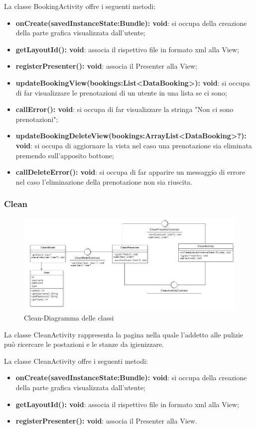 La classe BookingActivity offre i seguenti metodi:
\begin{itemize}
	\item \textbf{onCreate(savedInstanceState:Bundle): void}: si occupa della creazione della parte grafica visualizzata dall'utente; 
	\item \textbf{getLayoutId(): void}: associa il rispettivo file in formato xml alla View;
	\item \textbf{registerPresenter(): void}: associa il Presenter alla View;
	\item \textbf{updateBookingView(bookings:List<DataBooking>): void}: si occupa di far visualizzare le prenotazioni di un utente in una lista se ci sono;
	\item \textbf{callError(): void}: si occupa di far visualizzare la stringa "Non ci sono prenotazioni";
	\item \textbf{updateBookingDeleteView(bookings:ArrayList<DataBooking>?): void}: si occupa di aggiornare la vista nel caso una prenotazione sia eliminata premendo sull'apposito bottone;
	\item \textbf{callDeleteError(): void}: si occupa di far apparire un messaggio di errore nel caso l'eliminazione della prenotazione non sia riuscita.
\end{itemize}

\subsubsection{Clean}
\begin{figure}[H]
	\centering
	\includegraphics[width=16cm]{res/images/Clean.png}
	\caption{Clean-Diagramma delle classi}
	\label{fig:Clean-Diagramma delle classi}
\end{figure}
La classe CleanActivity rappresenta la pagina nella quale l'addetto alle pulizie può ricercare le postazioni e le stanze da igienizzare.

La classe CleanActivity offre i seguenti metodi:
\begin{itemize}
	\item \textbf{onCreate(savedInstanceState:Bundle): void}: si occupa della creazione della parte grafica visualizzata dall'utente; 
	\item \textbf{getLayoutId(): void}: associa il rispettivo file in formato xml alla View;
	\item \textbf{registerPresenter(): void}: associa il Presenter alla View.
\end{itemize}

